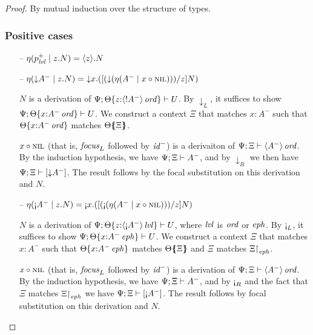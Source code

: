 \begin{proof} By mutual induction over the structure of types.

\subsubsection{Positive cases}

\begin{itemize}
\item[--] $\etapa{z}{N}{p^+_\mlvl} = \tetap{z}{N}$
\item[--] $\etapa{z}{N}{{\downarrow}A^-} 
           = \tdownl{x}{([(\tdownr{(\etana{\tfocusl{x}{\tnil}}{A^-})})/z]N)}$
  \smallskip

  $N$ is a derivation of 
  $\foc{\Psi}{\tackon{\Theta}{z{:}\istrue{\susp{{!}A^-}}}}{U}$.
  By ${\downarrow_L}$, it suffices to show 
  $\foc{\Psi}{\tackon{\Theta}{x{:}\istrue{A^-}}}{U}$.
  We construct a context $\Xi$ that matches $x{:}A^-$ such that
  $\tackon{\Theta}{x{:}\istrue{A^-}}$ matches $\frameoff{\Theta}{\Xi}$.
  \smallskip

  $\tfocusl{x}{\tnil}$ (that is, ${\it focus}_L$ followed by ${\it id}^-$) 
  is a derivaiton of 
  $\foc{\Psi}{\Xi}{\istrue{\susp{A^-}}}$.
  By the induction hypothesis, we have 
  $\foc{\Psi}{\Xi}{A^-}$, and by ${\downarrow}_R$
  we then have 
  $\foc{\Psi}{\Xi}{[ {\downarrow}{A^-} ]}$. 
  The result follows by the focal substitution on this derivation and $N$.
  \smallskip

\item[--] $\etapa{z}{N}{{\gnab}A^-}
           = \tgnabl{x}{([(\tgnabr{(\etana{\tfocusl{x}{\tnil}}{A^-})})/z]N)}$ 
  \smallskip

  $N$ is a derivation of 
  $\foc{\Psi}{\tackon{\Theta}{z{:}\islvl{\susp{{\gnab}A^-}}}}{U}$, where
  $\mlvl$ is $\mtrue$ or $\meph$.
  By ${\gnab}_L$, it suffices to show 
  $\foc{\Psi}{\tackon{\Theta}{x{:}\iseph{A^-}}}{U}$.
  We construct a context $\Xi$ that matches $x{:}A^-$ such that
  $\tackon{\Theta}{x{:}\iseph{A^-}}$ matches $\frameoff{\Theta}{\Xi}$
  and $\Xi$ matches $\restrictto{\Xi}{\meph}$.
  \smallskip

  $\tfocusl{x}{\tnil}$ (that is, ${\it focus}_L$ followed by
  ${\it id}^-$) is a derivation of $\foc{\Psi}{\Xi}{\istrue{\susp{A^-}}}$. 
  By the induction hypothesis, we have $\foc{\Psi}{\Xi}{A^-}$, 
  and by ${\gnab}_R$ and the fact that $\Xi$ matches $\restrictto{\Xi}{\meph}$
  we have $\foc{\Psi}{\Xi}{[{\gnab}A^-]}$. The result follows
  by focal substitution on this derivation and $N$.
  \smallskip


\end{itemize}
\end{proof}
